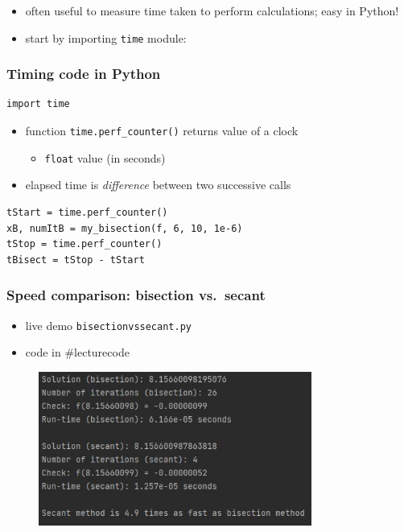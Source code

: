 \documentclass[english,14pt]{beamer}
\begin{document}
\begin{frame}[fragile]

\begin{itemize}
	\item often useful to measure time taken to perform calculations; easy in Python!
	\item start by importing \texttt{time} module:
\end{itemize}

\frametitle{Timing code in Python}
\begin{lstlisting}[style=CStyle,basicstyle=\scriptsize]
import time
\end{lstlisting}

\begin{itemize}
	\item function \texttt{time.perf\_counter()} returns value of a clock
	\begin{itemize}
		\item \texttt{float} value (in seconds) 
	\end{itemize}
	\item elapsed time is \emph{difference} between two successive calls
\end{itemize}

\begin{lstlisting}[style=CStyle,basicstyle=\scriptsize]
tStart = time.perf_counter()
xB, numItB = my_bisection(f, 6, 10, 1e-6)
tStop = time.perf_counter()
tBisect = tStop - tStart
\end{lstlisting}

\end{frame}


\begin{frame}[fragile]

\frametitle{Speed comparison: bisection vs.~secant}

\begin{itemize}
	\item live demo \texttt{bisectionvssecant.py}
	\item code in \#lecturecode
\end{itemize}

\begin{figure}[ht]
	\centering
	\includegraphics[width=0.8\textwidth]{figures/BisectionSecantSpeed}
\end{figure}

\end{frame}
\end{document}
